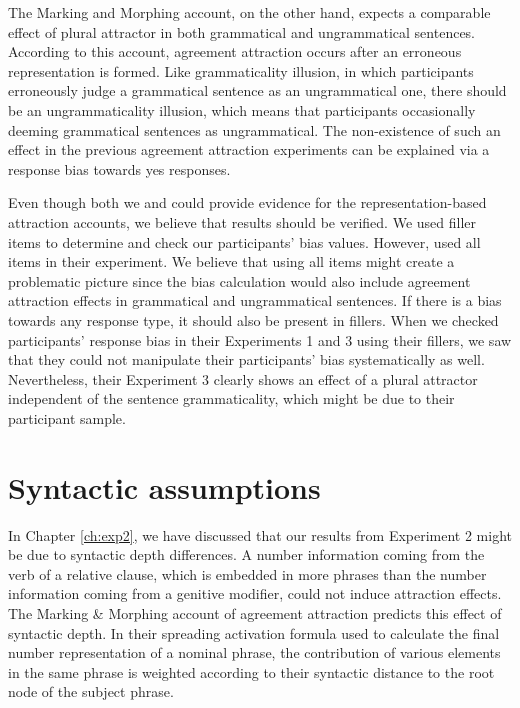The Marking and Morphing account, on the other hand, expects a comparable effect of plural attractor in both grammatical and ungrammatical sentences. According to this account, agreement attraction occurs after an erroneous representation is formed. Like grammaticality illusion, in which participants erroneously judge a grammatical sentence as an ungrammatical one, there should be an ungrammaticality illusion, which means that participants occasionally deeming grammatical sentences as ungrammatical. The non-existence of such an effect in the previous agreement attraction experiments can be explained via a response bias towards yes responses.

Even though both we and  could provide evidence for the representation-based attraction accounts, we believe that \cites{HammerlyEtAl2019} results should be verified. We used filler items to determine and check our participants' bias values. However,  used all items in their experiment. We believe that using all items might create a problematic picture since the bias calculation would also include agreement attraction effects in grammatical and ungrammatical sentences. If there is a bias towards any response type, it should also be present in fillers. When we checked participants' response bias in their Experiments 1 and 3 using their fillers, we saw that they could not manipulate their participants' bias systematically as well. Nevertheless, their Experiment 3 clearly shows an effect of a plural attractor independent of the sentence grammaticality, which might be due to their participant sample.

\section{Syntactic assumptions} \label{ch6syntax}

In Chapter \ref{ch:exp2}, we have discussed that our results from Experiment 2 might be due to syntactic depth differences. A number information coming from the verb of a relative clause, which is embedded in more phrases than the number information coming from a genitive modifier, could not induce attraction effects. The Marking \& Morphing account of agreement attraction predicts this effect of syntactic depth. In their spreading activation formula used to calculate the final number representation of a nominal phrase, the contribution of various elements in the same phrase is weighted according to their syntactic distance to the root node of the subject phrase.


